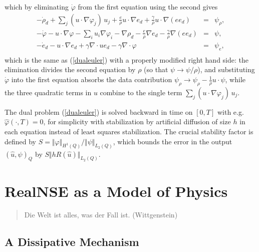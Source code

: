 which by eliminating $\dot\varphi$ from the first equation using
the second gives
\[
\begin{array}{rcl}
-\dot \rho_d+\sum_{j}(u\cdot\nabla\varphi_{j})\,u_j+\frac{e}{\rho}u\cdot\nabla e_d+\frac{\gamma}{\rho}u\cdot\nabla (ee_d)
&=&  \psi_\rho , \\
-\dot\varphi - u\cdot\nabla\varphi -\sum_iu_i\nabla\varphi_{i}-\nabla\rho_d 
-\frac{e}{\rho}\nabla e_d-\frac{\gamma}{\rho}\nabla (e e_d)&=&  \psi , \\
-\dot e_d -u\cdot\nabla e_d+\gamma\nabla\cdot ue_d-
\gamma\nabla\cdot\varphi &=& \psi_e ,\\ 
\end{array} 
\]
which is the same as (\ref{dualeuler}) with a properly modified right
hand side: the elimination divides the second equation by $\rho$
(so that $\psi\to\psi/\rho$), and substituting $\dot\varphi$ into the
first equation absorbs the data contribution
$\psi_\rho\to\psi_\rho-\frac{1}{\rho}u\cdot\psi$, while the three
quadratic terms in $u$ combine to the single term
$\sum_j(u\cdot\nabla\varphi_j)\,u_j$.

The dual problem (\ref{dualeuler}) is solved backward in time on $[0,T]$
with e.g. $\hat\varphi (\cdot ,T)=0$, for simplicity with stabilization 
by artificial diffusion of size $h$ in each equation instead
of least squares stabilization. The crucial stability factor
is defined by $S=\Vert\varphi\Vert_{H^1(Q)}/\Vert\psi\Vert_{L_2(Q)}$,
which bounds the error in the output $(\hat u,\psi )_Q$ by 
$S\Vert hR(\hat u)\Vert_{L_2(Q)}$.
 



   




\iffalse  %
\chapter{RealNSE as a Model of Physics}

\small
\begin{quote}
Die Welt ist alles, was der Fall ist. (Wittgenstein)
\end{quote}
\normalsize
   

\section{A Dissipative Mechanism}

